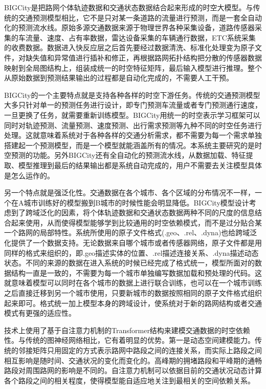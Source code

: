 BIGCity是把路网个体轨迹数据和交通状态数据结合起来形成的时空大模型。与传统的交通预测模型相比，它不是只对某一条道路的流量进行预测，而是一套全自动化的预测流水线。原始多源交通数据来源于物理世界各种采集设备，道路传感器采集的车流量、速度、占有率数据，雷达设备采集的车辆通行数据，ETC系统采集的收费数据。数据进入快反应层之后首先要经过数据清洗、标准化处理变为原子文件，对缺失值和异常值进行插补和修正，再根据路网拓扑结构把分散的传感器数据映射到全局图结构上，组装成统一的时空特征矩阵，最后输入模型进行推理。整个从原始数据到预测结果输出的过程都是自动化完成的，不需要人工干预。

BIGCity的一个主要特点就是支持各种各样的时空下游任务。传统的交通预测模型大多只针对单一的预测任务进行设计，即专门预测车流量或者专门预测通行速度，一旦更换了任务，就需要重新训练模型。BIGCity用统一的时空表示学习框架可以同时对轨迹预测、流量预测、速度预测、出行需求预测等九种不同的时空任务进行处理。这就意味着系统对于各种各样的交通分析需求，都不需要为每一个需求单独搭建起一个预测模型，而是一个模型就能涵盖所有的情况。本系统主要研究的是时空预测的功能。另外BIGCity还有全自动化的预测流水线，从数据加载、特征提取、模型推理到最后的结果输出都是系统自动完成的，用户不需要去关注模型具体是怎么运作的。

另一个特点就是强泛化性。交通数据在各个城市、各个区域的分布情况不一样，一个在A城市训练好的模型搬到B城市的时候性能会明显降低。BIGCity模型设计考虑到了跨域泛化的因素，将个体轨迹数据和交通状态数据两种不同的尺度的信息结合起来使用，从而使得模型能够学到比较通用的时空依赖模式，而不是过分贴合某一个路网的局部特性。系统所使用的原子文件格式(.geo、.rel、.dyna)也给跨域泛化提供了一个数据支持。无论数据来自哪个城市或者传感器网络，原子文件都是用同样的格式来组织的，即.geo描述实体的位置、.rel描述连接关系、.dyna描述动态状态。不同的来源的数据在进入系统的时候已经完成了格式统一，模型所面对的数据结构一直是一致的，不需要为每一个城市单独编写数据加载和预处理的代码。这就意味着模型可以同时在各个城市的数据上进行联合训练，也可以在一个城市训练之后直接迁移到另一个城市使用，只要新城市的数据按照相同的原子文件格式组织起来即可。格式统一加上模型本身的跨域设计，使系统对于新的路网结构或者交通模式有更强的适应性。

技术上使用了基于自注意力机制的Transformer结构来建模交通数据的时空依赖性。与传统的图神经网络相比，它有着明显的优势。第一是动态空间建模能力。传统的邻接矩阵只用固定的方式表示路网中路段之间的连接关系，而实际上路段之间相互影响是随时间、交通状况的变化而变化的。高峰期的拥堵路段和平峰期的通畅路段对周围路网的影响是不同的。自注意力机制可以依据目前的交通状况动态计算各个路段之间的相关程度，使得模型能自适应地关注到最相关的空间依赖关系。

